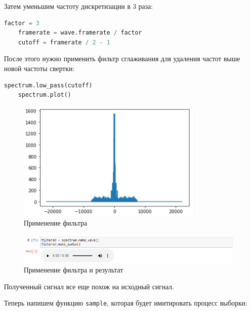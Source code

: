 \documentclass[a4paper]{article}
\begin{document}
            Затем уменьшим частоту дискретизации в 3 раза:
            
\begin{lstlisting}[language=Python, caption= Уменьшение частоты дискретизации в 3 раза]
    factor = 3
    framerate = wave.framerate / factor
    cutoff = framerate / 2 - 1
\end{lstlisting}
            
            После этого нужно применить фильтр сглаживания для удаления частот выше новой частоты свертки:
            
\begin{lstlisting}[language=Python, caption= Применение фильтра]
    spectrum.low_pass(cutoff)
    spectrum.plot()
\end{lstlisting}
            
            \begin{figure}[H]
                \centering
                \includegraphics{ex_3_7.png}
                \caption{Применение фильтра}
                \label{fig:ex_3_7}
            \end{figure}
            
            \begin{figure}[H]
                \centering
                \includegraphics[width=\textwidth]{ex_3_4.png}
                \caption{Применение фильтра и результат}
                \label{fig:ex_3_4}
            \end{figure}
            
            Полученный сигнал все еще похож на исходный сигнал.
            
            Теперь напишем функцию \texttt{sample}, которая будет имитировать процесс выборки:
            
\end{document}
